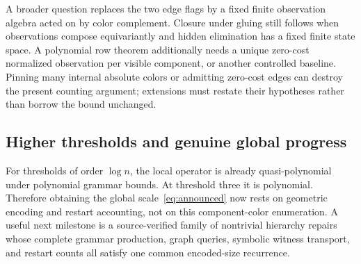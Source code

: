 \documentclass[11pt,letterpaper]{article}
\theoremstyle{definition}
\theoremstyle{remark}\newtheorem{remark}[theorem]{Remark}
\begin{document}
A broader question replaces the two edge flags by a fixed finite observation algebra acted on by color complement. Closure under gluing still follows when observations compose equivariantly and hidden elimination has a fixed finite state space. A polynomial row theorem additionally needs a unique zero-cost normalized observation per visible component, or another controlled baseline. Pinning many internal absolute colors or admitting zero-cost edges can destroy the present counting argument; extensions must restate their hypotheses rather than borrow the bound unchanged.

\subsection{Higher thresholds and genuine global progress}
For thresholds of order $\log n$, the local operator is already quasi-polynomial under polynomial grammar bounds. At threshold three it is polynomial. Therefore obtaining the global scale~\eqref{eq:announced} now rests on geometric encoding and restart accounting, not on this component-color enumeration. A useful next milestone is a source-verified family of nontrivial hierarchy repairs whose complete grammar production, graph queries, symbolic witness transport, and restart counts all satisfy one common encoded-size recurrence.
\end{document}
